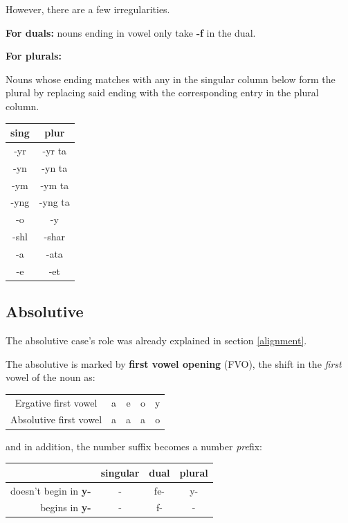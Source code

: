 \documentclass[10pt,oneside]{memoir}
\begin{document}
\begin{multicols}{2}
However, there are a few irregularities.

\textbf{For duals:} nouns ending in vowel only take \textbf{-f} in the dual.

\textbf{For plurals:}

Nouns whose ending matches with any in the singular column below form the plural by replacing said ending with the corresponding entry in the plural column.


\begin{center}
\begin{tabular}[]{c |c}
    \textbf{sing} & \textbf{plur}\\
    \hline
    -yr & -yr ta\\
    -yn & -yn ta\\
    -ym & -ym ta\\
    -yng & -yng ta\\
    -o & -y\\
    -shl & -shar\\
    -a  & -ata\\
    -e & -et\\

\end{tabular}
\end{center}


\subsection{Absolutive}

The absolutive case's role was already explained in section \ref{alignment}.

The absolutive is marked by \textbf{first vowel opening} (FVO), the shift in the \emph{first} vowel of the noun as:

\begin{tabular}{c | c c c c}
	Ergative first vowel & a  &e  &o & y\\
	Absolutive first vowel & a & a & a & o
\end{tabular}

and in addition, the number suffix becomes a number \emph{pre}fix:

\begin{center}
    \begin{tabular}[]{r c c c}
        & singular & dual & plural\\
        \hline
        doesn't begin in \textbf{y-}  &  -       & fe-   & y-\\
        begins in \textbf{y-} & - & f- & -
    \end{tabular}
\end{center}


\end{multicols}
\end{document}
